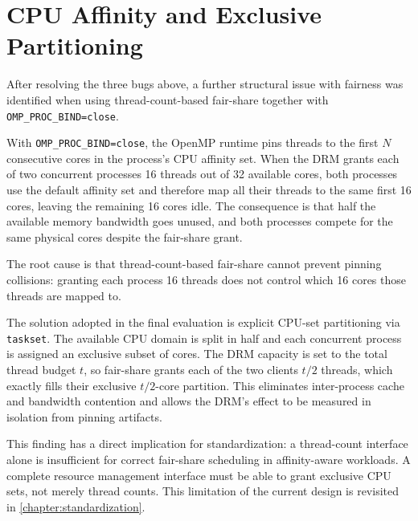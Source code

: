 \section{CPU Affinity and Exclusive Partitioning}

After resolving the three bugs above, a further structural issue with fairness was identified when using thread-count-based fair-share together with \texttt{OMP\_PROC\_BIND=close}.

With \texttt{OMP\_PROC\_BIND=close}, the OpenMP runtime pins threads to the first $N$ consecutive cores in the process's CPU affinity set. When the DRM grants each of two concurrent processes 16 threads out of 32 available cores, both processes use the default affinity set and therefore map all their threads to the same first 16 cores, leaving the remaining 16 cores idle. The consequence is that half the available memory bandwidth goes unused, and both processes compete for the same physical cores despite the fair-share grant.

The root cause is that thread-count-based fair-share cannot prevent pinning collisions: granting each process 16 threads does not control which 16 cores those threads are mapped to.

The solution adopted in the final evaluation is explicit CPU-set partitioning via \texttt{taskset}. The available CPU domain is split in half and each concurrent process is assigned an exclusive subset of cores. The DRM capacity is set to the total thread budget $t$, so fair-share grants each of the two clients $t/2$ threads, which exactly fills their exclusive $t/2$-core partition. This eliminates inter-process cache and bandwidth contention and allows the DRM's effect to be measured in isolation from pinning artifacts.

This finding has a direct implication for standardization: a thread-count interface alone is insufficient for correct fair-share scheduling in affinity-aware workloads. A complete resource management interface must be able to grant exclusive CPU sets, not merely thread counts. This limitation of the current design is revisited in \autoref{chapter:standardization}.
